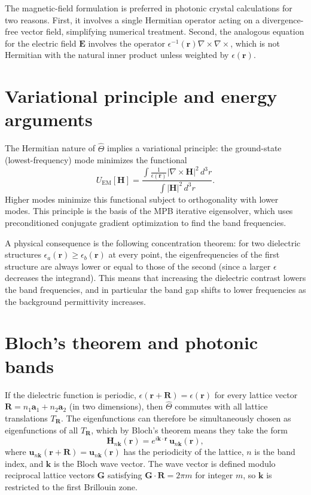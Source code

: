 \documentclass[12pt,a4paper,oneside]{book}
\theoremstyle{plain}
\theoremstyle{definition}
\theoremstyle{remark}
\newcommand{\vb}[1]{\bm{#1}}
\newcommand{\Hfield}{\vb{H}}
\newcommand{\Efield}{\vb{E}}
\newcommand{\eps}{\epsilon}
\newcommand{\kvec}{\vb{k}}
\newcommand{\rvec}{\vb{r}}
\newcommand{\Rvec}{\vb{R}}
\begin{document}
The magnetic-field formulation is preferred in photonic crystal calculations for two reasons. First, it involves a single Hermitian operator acting on a divergence-free vector field, simplifying numerical treatment. Second, the analogous equation for the electric field $\Efield$ involves the operator $\eps^{-1}(\rvec)\nabla\times\nabla\times$, which is not Hermitian with the natural inner product unless weighted by $\eps(\rvec)$.

\section{Variational principle and energy arguments}
\label{sec:variational}

The Hermitian nature of $\hat{\Theta}$ implies a variational principle: the ground-state (lowest-frequency) mode minimizes the functional
\begin{equation}
  U_\mathrm{EM}[\Hfield] = \frac{\int \frac{1}{\eps(\rvec)} |\nabla\times\Hfield|^2\,d^3r}{\int |\Hfield|^2\,d^3r}.
\end{equation}
Higher modes minimize this functional subject to orthogonality with lower modes. This principle is the basis of the MPB iterative eigensolver, which uses preconditioned conjugate gradient optimization to find the band frequencies.

A physical consequence is the following concentration theorem: for two dielectric structures $\eps_a(\rvec) \geq \eps_b(\rvec)$ at every point, the eigenfrequencies of the first structure are always lower or equal to those of the second (since a larger $\eps$ decreases the integrand). This means that increasing the dielectric contrast lowers the band frequencies, and in particular the band gap shifts to lower frequencies as the background permittivity increases.

\section{Bloch's theorem and photonic bands}
\label{sec:bloch}

If the dielectric function is periodic, $\eps(\rvec + \Rvec) = \eps(\rvec)$ for every lattice vector $\Rvec = n_1\vb{a}_1 + n_2\vb{a}_2$ (in two dimensions), then $\hat{\Theta}$ commutes with all lattice translations $T_{\Rvec}$. The eigenfunctions can therefore be simultaneously chosen as eigenfunctions of all $T_{\Rvec}$, which by Bloch's theorem means they take the form
\begin{equation}
  \Hfield_{n\kvec}(\rvec) = e^{i\kvec\cdot\rvec}\, \vb{u}_{n\kvec}(\rvec),
  \label{eq:bloch-mode}
\end{equation}
where $\vb{u}_{n\kvec}(\rvec + \Rvec) = \vb{u}_{n\kvec}(\rvec)$ has the periodicity of the lattice, $n$ is the band index, and $\kvec$ is the Bloch wave vector. The wave vector is defined modulo reciprocal lattice vectors $\vb{G}$ satisfying $\vb{G}\cdot\Rvec = 2\pi m$ for integer $m$, so $\kvec$ is restricted to the first Brillouin zone.
\end{document}
